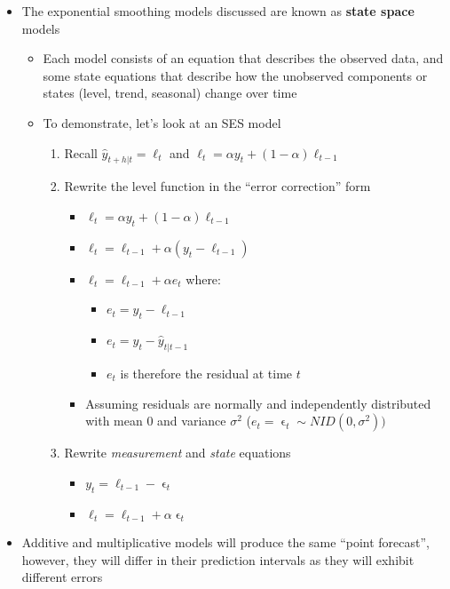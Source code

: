 \documentclass{article}\usepackage[]{graphicx}\usepackage[]{color}
\begin{document}
\begin{itemize}
    \item The exponential smoothing models discussed are known as \textbf{state space} models
    \begin{itemize}
        \item Each model consists of an equation that describes the observed data, and some state equations that describe how the unobserved components or states (level, trend, seasonal) change over time
        \item To demonstrate, let's look at an SES model
        \begin{enumerate}
            \item Recall $\hat{y}_{t+h|t} = \ell_t$ and $\ell_t = \alpha y_t + (1-\alpha)\ell_{t-1}$
            \item Rewrite the level function in the ``error correction'' form
            \begin{itemize}
                \item $\ell_t = \alpha y_t + (1-\alpha)\ell_{t-1}$
                \item $\ell_t = \ell_{t-1} + \alpha(y_t - \ell_{t-1})$
                \item $\ell_t = \ell_{t-1} + \alpha e_t$ where:
                \begin{itemize}
                    \item $e_t = y_t - \ell_{t-1}$
                    \item $e_t = y_t - \hat{y}_{t|t-1}$
                    \item $e_t$ is therefore the residual at time $t$
                \end{itemize}
                \item Assuming residuals are normally and independently distributed with mean 0 and variance $\sigma^2$ ($e_t = \upvarepsilon_t \sim NID(0, \sigma^2))$
            \end{itemize}
            \item Rewrite \textit{measurement} and \textit{state} equations
            \begin{itemize}
                \item $y_t = \ell_{t-1} - \upvarepsilon_t$
                \item $\ell_t = \ell_{t-1} + \alpha \upvarepsilon_t$
            \end{itemize}
        \end{enumerate}
    \end{itemize}
    \item Additive and multiplicative models will produce the same ``point forecast'', however, they will differ in their prediction intervals as they will exhibit different errors

\end{itemize}
\end{document}

